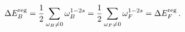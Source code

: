 \begin{equation}
\Delta E_B^{\rm reg} = \frac 12 \sum_{\omega_B\ne 0}
\omega_B^{1-2s} =\frac 12 \sum_{\omega_F\ne 0} \omega_F^{1-2s} =
\Delta E_F^{\rm reg} \,.\label{DEBDEF}
\end{equation}

